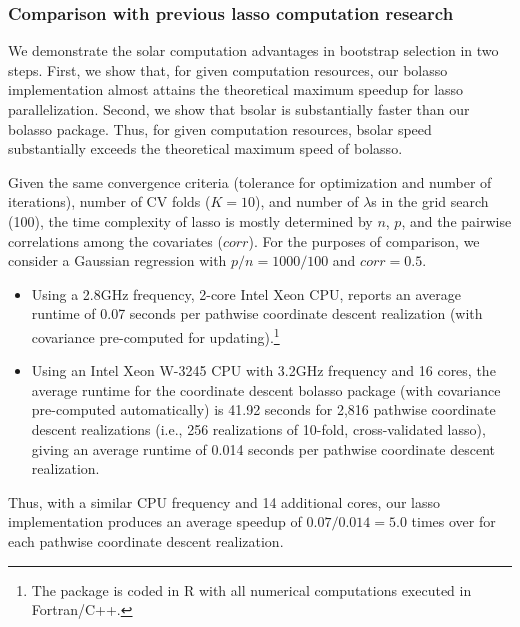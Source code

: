 \documentclass[11pt,review,authoryear]{elsarticle}
\begin{document}
\subsubsection{Comparison with previous lasso computation research}

We demonstrate the solar computation advantages in bootstrap selection in two steps. First, we show that, for given computation resources, our bolasso implementation almost attains the theoretical maximum speedup for lasso parallelization. Second, we show that bsolar is substantially faster than our bolasso package. Thus, for given computation resources, bsolar speed substantially exceeds the theoretical maximum speed of bolasso.

Given the same convergence criteria (tolerance for optimization and number of iterations), number of CV folds ($K=10$), and number of $\lambda$s in the grid search (100), the time complexity of lasso is mostly determined by $n$, $p$, and the pairwise correlations among the covariates ($corr$). For the purposes of comparison, we consider a Gaussian regression with $p/n=1000/100$ and $corr=0.5$.

\begin{itemize}
  \item     Using a 2.8GHz frequency, 2-core Intel Xeon CPU,
      \citet[Table 1]{friedman2010regularization} reports an average runtime of 0.07 seconds per pathwise coordinate descent realization (with covariance pre-computed for updating).\footnote{The \citet{friedman2010regularization} package is coded in \textsf{R} with all numerical computations executed in Fortran/C++.}
  \item Using an Intel Xeon W-3245 CPU with 3.2GHz frequency and 16 cores, the average runtime for the coordinate descent bolasso package (with covariance pre-computed automatically) is 41.92 seconds for 2,816 pathwise coordinate descent realizations (i.e., 256 realizations of 10-fold, cross-validated lasso), giving an average runtime of 0.014 seconds per pathwise coordinate descent realization.
\end{itemize}

\noindent
Thus, with a similar CPU frequency and 14 additional cores, our lasso implementation produces an average speedup of $0.07/0.014=5.0$ times over \citet{friedman2010regularization} for each pathwise coordinate descent realization.
\end{document}
